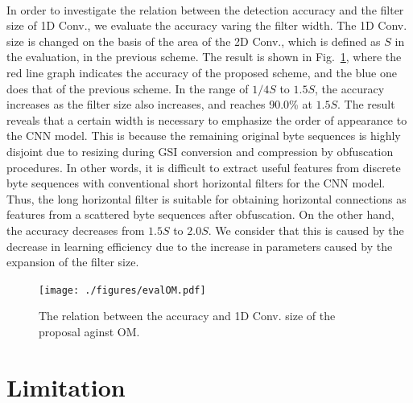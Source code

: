 \documentclass{ieeeaccess}
\newcommand{\myfigurename}{Fig.}
\begin{document}
\paragraph*{}
In order to investigate the relation between the detection accuracy and the filter size of 1D Conv., we evaluate the accuracy varing the filter width.
The 1D Conv. size is changed on the basis of the area of the 2D Conv., which is defined as $S$ in the evaluation, in the previous scheme.
The result is shown in \myfigurename~\ref{fig:evalOM}, where the red line graph indicates the accuracy of the proposed scheme, and the blue one does that of the previous scheme.
In the range of $1/4S$ to $1.5S$, the accuracy increases as the filter size also increases, and reaches 90.0\% at $1.5S$.
The result reveals that a certain width is necessary to emphasize the order of appearance to the CNN model.
This is because the remaining original byte sequences is highly disjoint due to resizing during GSI conversion and compression by obfuscation procedures.
In other words, it is difficult to extract useful features from discrete byte sequences with conventional short horizontal filters for the CNN model.
Thus, the long horizontal filter is suitable for obtaining horizontal connections as features from a scattered byte sequences after obfuscation.
On the other hand, the accuracy decreases from $1.5S$ to $2.0S$.
We consider that this is caused by the decrease in learning efficiency due to the increase in parameters caused by the expansion of the filter size.

\begin{figure}[t]
 \centering
 \texttt{[image: ./figures/evalOM.pdf]}
 \caption{The relation between the accuracy and 1D Conv. size of the proposal aginst OM.} 
 \label{fig:evalOM}
\end{figure}

\section{Limitation} \label{sec:limitation}
\end{document}
